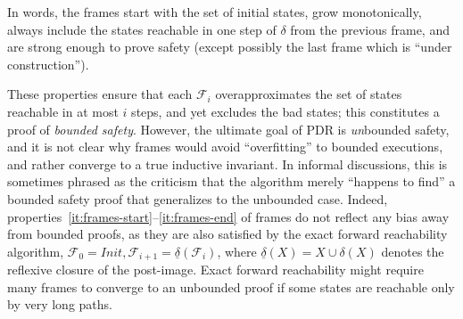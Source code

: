 \documentclass[acmsmall,screen]{acmart}
\newcommand{\Init}{{\textit{Init}}}
\newcommand{\tr}{\delta}
\newcommand{\Frame}{\mathcal{F}}
\newcommand{\reflextr}[1]{\underline{#1}}
\newcommand{\postimage}[2]{{\reflextr{#1}}({#2})}
\begin{document}
\noindent
In words, the frames start with the set of initial states, grow monotonically, always include the states reachable in one step of $\tr$ from the previous frame, and are strong enough to prove safety (except possibly the last frame which is ``under construction'').

These properties ensure that each $\Frame_i$ overapproximates the set of states reachable in at most $i$ steps, and yet excludes the bad states; this constitutes a proof of \emph{bounded safety}. However, the ultimate goal of PDR is \emph{un}bounded safety, and it is not clear why frames would avoid ``overfitting'' to bounded executions, and rather converge to a true inductive invariant. In informal discussions, this is sometimes phrased as the criticism that the algorithm merely ``happens to find'' a bounded safety proof that generalizes to the unbounded case.
%
Indeed, properties~\ref{it:frames-start}--\ref{it:frames-end} of frames do not reflect any bias away from bounded proofs, as they are also satisfied by the exact forward reachability algorithm, $\Frame_0 = \Init, \Frame_{i+1}=\postimage{\tr}{\Frame_i}$, where $\postimage{\tr}{X} = X \cup \tr(X)$ denotes the reflexive closure of the post-image. Exact forward reachability might require many frames to converge to an unbounded proof if some states are reachable only by very long paths.
%

%
\end{document}
